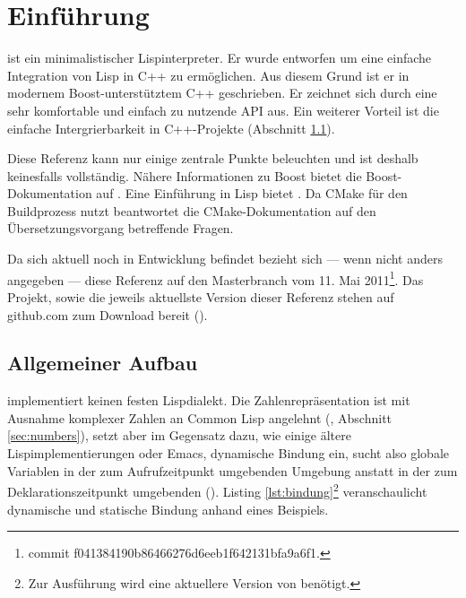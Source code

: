 \section{Einführung}
\label{sec:einfuehrung}

\projectname{} ist ein minimalistischer Lispinterpreter. Er wurde entworfen um eine einfache
Integration von Lisp in C++ zu ermöglichen. Aus diesem Grund ist er in modernem Boost-unterstütztem
C++ geschrieben. Er zeichnet sich durch eine sehr komfortable und einfach zu nutzende API aus.
Ein weiterer Vorteil ist die einfache Intergrierbarkeit in C++-Projekte (Abschnitt \ref{sec:environment}).

Diese Referenz kann nur einige zentrale Punkte beleuchten und ist deshalb keinesfalls vollständig. Nähere Informationen zu Boost bietet die Boost-Do\-ku\-men\-ta\-tion auf \cite{smart_ptr_online}. Eine Einführung in Lisp bietet \cite{graham_ansi_1995}. Da \projectname{} CMake für den Buildprozess nutzt beantwortet die CMake-Dokumentation auf \cite{cmake_online} den Übersetzungsvorgang betreffende Fragen.

Da sich \projectname{} aktuell noch in Entwicklung befindet bezieht sich --- wenn nicht anders angegeben --- diese Referenz auf den Masterbranch vom 11. Mai 2011\footnote{commit f041384190b86466276d6eeb1f642131bfa9a6f1.}.
Das Projekt, sowie die jeweils aktuellste Version dieser Referenz stehen auf github.com zum Download bereit (\cite{lisp_interaction_online}\cite{lisp_interaction_ref_online}). %

\subsection{Allgemeiner Aufbau}
\label{sec:environment}

\projectname{} implementiert keinen festen Lispdialekt. Die Zahlenrepräsentation ist mit Ausnahme komplexer Zahlen an Common Lisp angelehnt (\cite[S. 143ff]{graham_ansi_1995}, Abschnitt \ref{sec:numbers}), setzt aber im Gegensatz dazu, wie einige ältere Lispimplementierungen oder Emacs, dynamische Bindung ein, sucht also globale Variablen in der zum Aufrufzeitpunkt umgebenden Umgebung anstatt in der zum Deklarationszeitpunkt umgebenden (\cite[36, 63]{wilhelm_uebersetzerbau_2007}\cite[112]{graham_ansi_1995}). Listing \ref{lst:bindung}\footnote{Zur Ausführung wird eine
  aktuellere Version von \projectname{} benötigt.}
veranschaulicht dynamische und statische Bindung anhand eines Beispiels.

